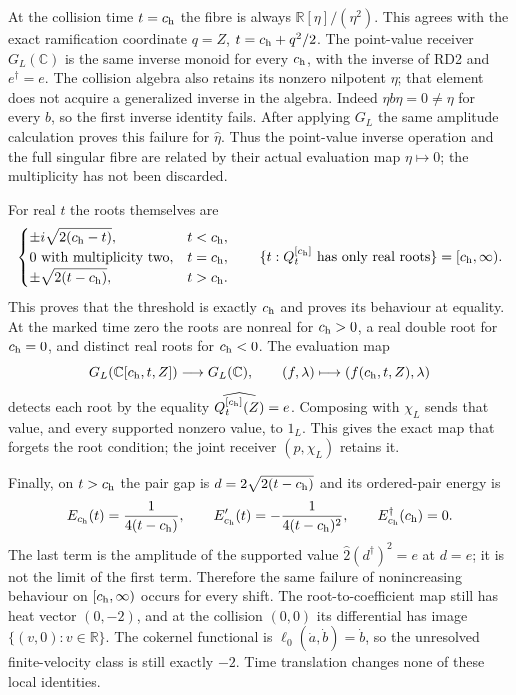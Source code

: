 At the collision time $t=c_{\rm h}$ the fibre is always
$\mathbb R[\eta]/(\eta^2)$. This agrees with the exact
ramification coordinate $q=Z$, $t=c_{\rm h}+q^2/2$. The
point-value receiver $G_L(\mathbb C)$ is the same inverse monoid
for every $c_{\rm h}$, with the inverse of RD2 and $e^\dagger=e$.
The collision algebra also retains its nonzero nilpotent $\eta$;
that element does not acquire a generalized inverse in the
algebra. Indeed $\eta b\eta=0\ne\eta$ for every $b$, so the
first inverse identity fails. After applying $G_L$ the same
amplitude calculation proves this failure for $\widehat\eta$.
Thus the point-value inverse operation and the full singular fibre
are related by their actual evaluation map $\eta\mapsto0$;
the multiplicity has not been discarded.

For real $t$ the roots themselves are
\begin{equation}
 \begin{cases}
  \displaystyle\pm i\sqrt{2(c_{\rm h}-t)},&t<c_{\rm h},\\
  0\text{ with multiplicity two},&t=c_{\rm h},\\
  \displaystyle\pm\sqrt{2(t-c_{\rm h})},&t>c_{\rm h}.
 \end{cases}
 \qquad
 \{t:Q_t^{[c_{\rm h}]}\text{ has only real roots}\}
       =[c_{\rm h},\infty).
 \label{eq:rd-shifted-threshold}
\end{equation}
This proves that the threshold is exactly $c_{\rm h}$ and proves
its behaviour at equality. At the marked time zero the roots are
nonreal for $c_{\rm h}>0$, a real double root for $c_{\rm h}=0$,
and distinct real roots for $c_{\rm h}<0$. The evaluation map
\[
 G_L(\mathbb C[c_{\rm h},t,Z])\longrightarrow G_L(\mathbb C),
 \qquad(f,\lambda)\longmapsto
       (f(c_{\rm h},t,Z),\lambda)
\]
detects each root by the equality
$\widehat{Q_t^{[c_{\rm h}]}(Z)}=e$. Composing with $\chi_L$
sends that value, and every supported nonzero value, to $1_L$.
This gives the exact map that forgets the root condition; the joint
receiver $(p,\chi_L)$ retains it.

Finally, on $t>c_{\rm h}$ the pair gap is
$d=2\sqrt{2(t-c_{\rm h})}$ and its ordered-pair energy is
\begin{equation}
 E_{c_{\rm h}}(t)=\frac1{4(t-c_{\rm h})},\qquad
 E_{c_{\rm h}}'(t)=-\frac1{4(t-c_{\rm h})^2},\qquad
 E_{c_{\rm h}}^\dagger(c_{\rm h})=0.
 \label{eq:rd-shifted-energy}
\end{equation}
The last term is the amplitude of the supported value
$\widehat2(d^\dagger)^2=e$ at $d=e$; it is not the limit of the
first term. Therefore the same failure of nonincreasing behaviour
on $[c_{\rm h},\infty)$ occurs for every shift. The root-to-coefficient
map still has heat vector $(0,-2)$, and at the collision $(0,0)$
its differential has image $\{(v,0):v\in\mathbb R\}$.
The cokernel functional is $\ell_0(\dot a,\dot b)=\dot b$, so
the unresolved finite-velocity class is still exactly $-2$.
Time translation changes none of these local identities.

